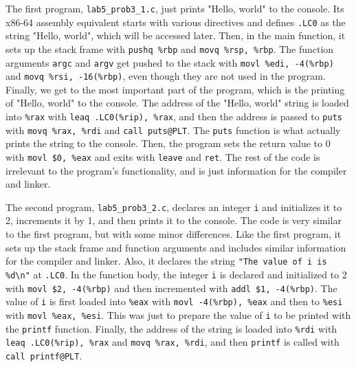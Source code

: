 \documentclass{article}
\begin{document}
\vspace{0.5cm}

The first program, \texttt{lab5\_prob3\_1.c}, just prints "Hello, world" to the console. 
Its x86-64 assembly equivalent starts with various directives and defines \texttt{.LC0} as the string "Hello, world", which will be accessed later.
Then, in the main function, it sets up the stack frame with \texttt{pushq \%rbp} and \texttt{movq \%rsp, \%rbp}.
The function arguments \texttt{argc} and \texttt{argv} get pushed to the stack with \texttt{movl \%edi, -4(\%rbp)} and \texttt{movq \%rsi, -16(\%rbp)},
even though they are not used in the program.
Finally, we get to the most important part of the program, which is the printing of "Hello, world" to the console.
The address of the "Hello, world" string is loaded into \texttt{\%rax} with \texttt{leaq .LC0(\%rip), \%rax}, and then the address is passed to \texttt{puts} with \texttt{movq \%rax, \%rdi} and \texttt{call puts@PLT}.
The \texttt{puts} function is what actually prints the string to the console.
Then, the program sets the return value to 0 with \texttt{movl \$0, \%eax} and exits with \texttt{leave} and \texttt{ret}.
The rest of the code is irrelevant to the program's functionality, and is just information for the compiler and linker.

The second program, \texttt{lab5\_prob3\_2.c}, declares an integer \texttt{i} and initializes it to 2, increments it by 1, and then prints it to the console.
The code is very similar to the first program, but with some minor differences.
Like the first program, it sets up the stack frame and function arguments and includes similar information for the compiler and linker.
Also, it declares the string \texttt{"The value of i is \%d\textbackslash n"} at \texttt{.LC0}.
In the function body, the integer \texttt{i} is declared and initialized to 2 with \texttt{movl \$2, -4(\%rbp)}
and then incremented with \texttt{addl \$1, -4(\%rbp)}.
The value of \texttt{i} is first loaded into \texttt{\%eax} with \texttt{movl -4(\%rbp), \%eax} and then to \texttt{\%esi} with \texttt{movl \%eax, \%esi}.
This was just to prepare the value of \texttt{i} to be printed with the \texttt{printf} function.
Finally, the address of the string is loaded into \texttt{\%rdi} with \texttt{leaq .LC0(\%rip), \%rax} and \texttt{movq \%rax, \%rdi}, and then \texttt{printf} is called with \texttt{call printf@PLT}.
\end{document}
